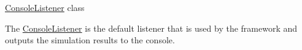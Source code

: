 \mbox{\hyperlink{classCore_1_1Listeners_1_1ConsoleListener}{Console\+Listener}} class

The \mbox{\hyperlink{classCore_1_1Listeners_1_1ConsoleListener}{Console\+Listener}} is the default listener that is used by the framework and outputs the simulation results to the console. 